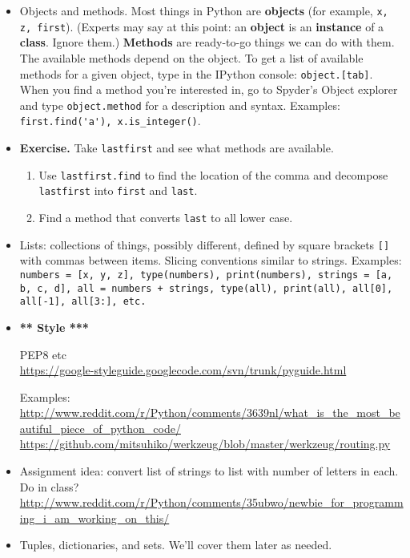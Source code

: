 \documentclass[11pt]{article}
\begin{document}
\begin{itemize}
\item Objects and methods.
Most things in Python are {\bf objects}
(for example, {\tt x, z, first}).
(Experts may say at this point:  an {\bf object} is an {\bf instance} of a {\bf class}.
Ignore them.)
{\bf Methods} are ready-to-go things we can do with them.
The available methods depend on the object.
To get a list of available methods for a given object,
type in the IPython console: {\tt object.[tab]}.
When you find a method you're interested in,
go to Spyder's Object explorer
and type {\tt object.method} for a description and syntax.
Examples:  \verb:first.find('a'), x.is_integer():.

\item {\bf Exercise.}  Take {\tt lastfirst} and see what methods are available.
\begin{enumerate}[label=(\alph*)]
\item Use {\tt lastfirst.find} to find the location of the comma and
decompose {\tt lastfirst} into {\tt first} and {\tt last}.
\item Find a method that converts {\tt last} to all lower case.
\end{enumerate}

\item Lists: collections of things, possibly different, defined by square brackets
{\tt []} with commas between items.
Slicing conventions similar to strings.
Examples:  {\tt numbers = [x, y, z], type(numbers),
print(numbers),
strings = [a, b, c, d],
all = numbers + strings, type(all),
print(all),
all[0], all[-1], all[3:], etc.}

\item {\bf *** Style ***}

PEP8 etc \\
\url{https://google-styleguide.googlecode.com/svn/trunk/pyguide.html}

Examples:  \\
\url{http://www.reddit.com/r/Python/comments/3639nl/what_is_the_most_beautiful_piece_of_python_code/}\\
\url{https://github.com/mitsuhiko/werkzeug/blob/master/werkzeug/routing.py} \\



\item Assignment idea:  convert list of strings to list with number of letters in each.  \\
Do in class?  \\
\url{http://www.reddit.com/r/Python/comments/35ubwo/newbie_for_programming_i_am_working_on_this/}


\item Tuples, dictionaries, and sets.  We'll cover them later as needed.

\end{itemize}
\end{document}
